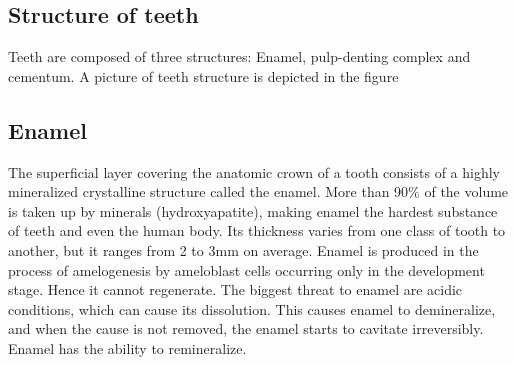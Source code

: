 \subsection{Structure of teeth}
Teeth are composed of three structures: Enamel, pulp-denting complex and cementum. A picture of teeth structure is depicted in the figure

\subsection*{Enamel}
The superficial layer covering the anatomic crown of a tooth consists of a highly mineralized crystalline structure called the enamel. More than 90\% of the volume is taken up by minerals (hydroxyapatite), making enamel the hardest substance of teeth and even the human body. Its thickness varies from one class of tooth to another, but it ranges from 2 to 3mm on average. Enamel is produced in the process of amelogenesis by ameloblast cells occurring only in the development stage. Hence it cannot regenerate. The biggest threat to enamel are acidic conditions, which can cause its dissolution. This causes enamel to demineralize, and when the cause is not removed, the enamel starts to cavitate irreversibly. Enamel has the ability to remineralize.

